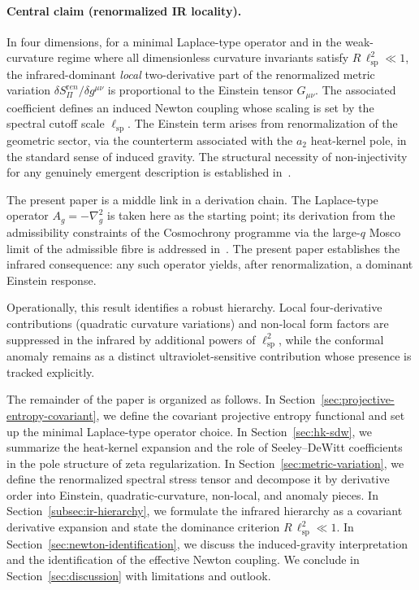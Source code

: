   \paragraph{Central claim (renormalized IR locality).}
    In four dimensions, for a minimal Laplace-type operator and in the weak-curvature regime where all dimensionless
    curvature invariants satisfy \(R\,\ell_{\mathrm{sp}}^2\ll 1\), the infrared-dominant \emph{local}
    two-derivative part of the
    renormalized metric variation \(\delta S_\Pi^{\mathrm ren}/\delta g^{\mu\nu}\) is proportional to the Einstein tensor
    \(G_{\mu\nu}\).
    The associated coefficient defines an induced Newton coupling whose scaling is set by the spectral cutoff scale
    \(\ell_{\mathrm{sp}}\).
    The Einstein term arises from renormalization of the geometric sector, via the counterterm associated with the
    \(a_2\) heat-kernel pole, in the standard sense of induced gravity.
    The structural necessity of non-injectivity for any genuinely emergent description is established
    in~\cite{Beau2026l}.

    The present paper is a middle link in a derivation chain.
    The Laplace-type operator $A_g = -\nabla^2_g$ is taken here as the starting point;
    its derivation from the admissibility constraints of the Cosmochrony programme
    via the large-$q$ Mosco limit of the admissible fibre is addressed in~\cite{Beau2026Q5a}.
    The present paper establishes the infrared consequence: any such operator yields,
    after renormalization, a dominant Einstein response.

    Operationally, this result identifies a robust hierarchy.
    Local four-derivative contributions (quadratic curvature variations) and non-local form factors are suppressed in the
    infrared by additional powers of \(\ell_{\mathrm{sp}}^2\), while the conformal anomaly remains as a distinct
    ultraviolet-sensitive
    contribution whose presence is tracked explicitly.

    The remainder of the paper is organized as follows.
    In Section~\ref{sec:projective-entropy-covariant}, we define the covariant projective entropy functional and set up the
    minimal Laplace-type operator choice.
    In Section~\ref{sec:hk-sdw}, we summarize the heat-kernel expansion and the role of Seeley--DeWitt coefficients in the
    pole structure of zeta regularization.
    In Section~\ref{sec:metric-variation}, we define the renormalized spectral stress tensor and decompose it by derivative
    order into Einstein, quadratic-curvature, non-local, and anomaly pieces.
    In Section~\ref{subsec:ir-hierarchy}, we formulate the infrared hierarchy as a covariant derivative expansion and
    state the dominance criterion \(R\,\ell_{\mathrm{sp}}^2\ll 1\).
    In Section~\ref{sec:newton-identification}, we discuss the induced-gravity interpretation and the identification of the
    effective Newton coupling.
    We conclude in Section~\ref{sec:discussion} with limitations and outlook.
